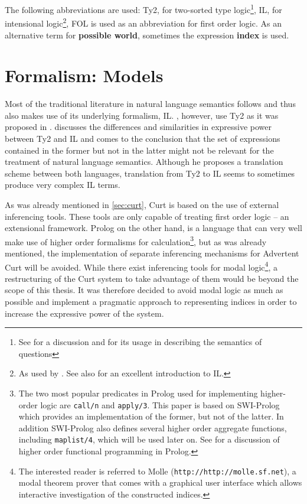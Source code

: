 \documentclass[notitlepage,twoside,a4paper]{scrreprt}
\newcommand{\abbr}{\textsf} %
\newcommand{\term}[1]{\textsf{\textbf{#1}}} %
\newcommand{\code}[1]{\texttt{#1}} %
\newcommand{\pn}{\textsf} %
\newcommand{\url}[1]{\code{http://#1}} %
\newcommand{\curt}{\pn{Curt}}
\newcommand{\acurt}{\pn{Advertent Curt}}
\newcommand{\prol}{\pn{Prolog}}
\theoremstyle{remark}
\theoremstyle{remark}
\theoremstyle{definition}
\theoremstyle{definition}
\begin{document}
The following abbreviations are used: 
\abbr{Ty2}, for two-sorted type logic\footnote{See \cite{gallin:ty2} for a
discussion and \cite{gs:sqpa} for its usage in describing the semantics of
questions}, \abbr{IL}, for intensional logic\footnote{As used by
\cite{ptq}. See also \cite{gamut:2} for an excellent introduction to \abbr{IL}.},
\abbr{FOL}  is used as an abbreviation for first order logic. As an alternative
term for \term{possible world}, sometimes the expression \term{index} is used.

\section{Formalism: Models}\label{sec:formal}

Most of the traditional literature in natural language semantics follows
\cite{ptq} and thus also makes use of its underlying formalism,
\abbr{IL}. \cite{gs:sqpa}, however, use \abbr{Ty2} as it was
proposed in \cite{gallin:ty2}. \cite{z:ilty2} discusses the differences and
similarities in expressive power between \abbr{Ty2} and \abbr{IL} and comes to
the conclusion that the set of expressions contained in the former but not in
the latter might not be relevant for the treatment of natural language
semantics. Although he proposes a translation scheme between both languages,
translation from \abbr{Ty2} to \abbr{IL} seems to sometimes produce very complex
\abbr{IL} terms.

As was already mentioned in \ref{sec:curt}, \curt{} is based on the use of
external inferencing tools. These tools are only capable of treating first order
logic – an extensional framework. \prol{} on the other hand, is a language that
can very well make use of higher order formalisms for calculation\footnote{The
two most popular predicates in \prol{} used for implementing higher-order logic
are \code{call/n} and \code{apply/3}. This paper is based on \pn{SWI-Prolog}
which provides an implementation of the former, but not of the latter. In
addition \pn{SWI-Prolog} also defines several higher order aggregate functions,
including \code{maplist/4}, which will be used later on. See
\cite{naish:prolhio} for a discussion of higher order functional programming in
\prol.}, but as was already mentioned, the implementation of separate
inferencing mechanisms for \acurt{} will be avoided. While there exist
inferencing tools for modal logic\footnote{ The interested reader is referred to
\pn{Molle} (\url{http://molle.sf.net}), a modal theorem prover that comes with a
graphical user interface which allows interactive investigation of the
constructed indices.}, a restructuring of the \curt{} system to take advantage
of them would be beyond the scope of this thesis.  It was therefore decided to
avoid modal logic as much as possible and implement a pragmatic approach to
representing indices in order to increase the expressive power of the system.
\end{document}
